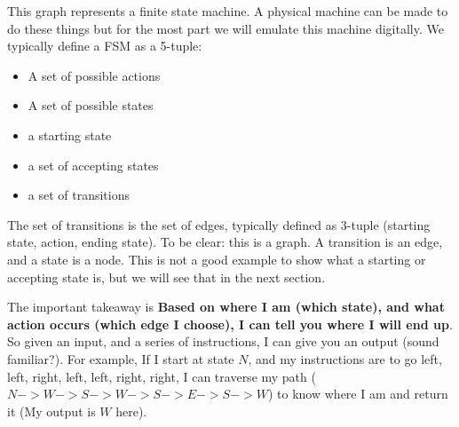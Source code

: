 \documentclass[main.tex]{subfiles}
\begin{document}
\begin{center}
\end{center}
This graph represents a finite state machine. A physical machine can be made to do these things but for the most part we will emulate this machine digitally. We typically define a FSM as a 5-tuple:
\begin{itemize}
    \item A set of possible actions
    \item A set of possible states
    \item a starting state
    \item a set of accepting states
    \item a set of transitions
\end{itemize}
The set of transitions is the set of edges, typically defined as 3-tuple (starting state, action, ending state). To be clear: this is a graph. A transition is an edge, and a state is a node. This is not a good example to show what a starting or accepting state is, but we will see that in the next section. 

The important takeaway is \textbf{Based on where I am (which state), and what action occurs (which edge I choose), I can tell you where I will end up}. So given an input, and a series of instructions, I can give you an output (sound familiar?). For example, If I start at state $N$, and my instructions are to go left, left, right, left, left, right, right, I can traverse my path ($N-> W -> S -> W -> S -> E -> S -> W$) to know where I am and return it (My output is $W$ here). 
\end{document}
